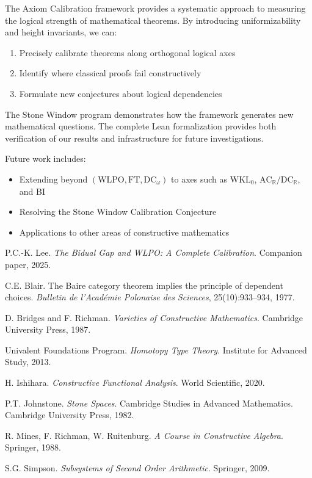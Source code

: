 \documentclass[11pt]{article}
\newcommand{\WLPO}{\mathrm{WLPO}}
\newcommand{\FT}{\mathrm{FT}}
\newcommand{\DCw}{\mathrm{DC}_\omega}
\newcommand{\ACR}{\mathrm{AC}_{\mathbb{R}}}
\newcommand{\DCR}{\mathrm{DC}_{\mathbb{R}}}
\newcommand{\WKLz}{\mathrm{WKL}_0}
\begin{document}
The Axiom Calibration framework provides a systematic approach to measuring the logical strength of mathematical theorems. By introducing uniformizability and height invariants, we can:

\begin{enumerate}
\item Precisely calibrate theorems along orthogonal logical axes
\item Identify where classical proofs fail constructively
\item Formulate new conjectures about logical dependencies
\end{enumerate}

The Stone Window program demonstrates how the framework generates new mathematical questions. The complete Lean formalization provides both verification of our results and infrastructure for future investigations.

Future work includes:
\begin{itemize}
\item Extending beyond $(\WLPO,\FT,\DCw)$ to axes such as $\WKLz$, $\ACR/\DCR$, and BI
\item Resolving the Stone Window Calibration Conjecture
\item Applications to other areas of constructive mathematics
\end{itemize}

\begin{thebibliography}{10}
 P.C.-K. Lee. \emph{The Bidual Gap and WLPO: A Complete Calibration}. Companion paper, 2025.

 C.E. Blair. The Baire category theorem implies the principle of dependent choices. \emph{Bulletin de l'Académie Polonaise des Sciences}, 25(10):933--934, 1977.

 D. Bridges and F. Richman. \emph{Varieties of Constructive Mathematics}. Cambridge University Press, 1987.

 Univalent Foundations Program. \emph{Homotopy Type Theory}. Institute for Advanced Study, 2013.

 H. Ishihara. \emph{Constructive Functional Analysis}. World Scientific, 2020.

 P.T. Johnstone. \emph{Stone Spaces}. Cambridge Studies in Advanced Mathematics. Cambridge University Press, 1982.

 R. Mines, F. Richman, W. Ruitenburg. \emph{A Course in Constructive Algebra}. Springer, 1988.

 S.G. Simpson. \emph{Subsystems of Second Order Arithmetic}. Springer, 2009.

\end{thebibliography}
\end{document}
